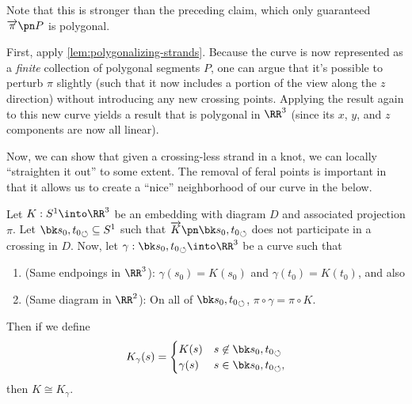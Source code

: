 Note that this is stronger than the preceding claim, which only
guaranteed $\fim{\pi}{P}$ is polygonal.
\begin{sproof}[Sketch]
  First, apply \cref{lem:polygonalizing-strands}. Because the curve is
  now represented as a \emph{finite} collection of polygonal segments
  $P$, one can argue that it's possible to perturb $\pi$ slightly
  (such that it now includes a portion of the view along the $z$
  direction) without introducing any new crossing points. Applying the
  result again to this new curve yields a result that is polygonal in
  $\RR^3$ (since its $x$, $y$, and $z$ components are now all linear).
\end{sproof}

Now, we can show that given a crossing-less strand in a knot, we can
locally ``straighten it out'' to some extent. The removal of feral
points is important in that it allows us to create a ``nice''
neighborhood of our curve in the below.
\begin{proposition}\label{prop:replacing-by-same-endpoints}
  Let $K : S^1 \into \RR^3$ be an embedding with diagram $D$ and
  associated projection $\pi$. Let $\sbk{s_0, t_0} \subseteq S^1$ such
  that $\fim{K}{\sbk{s_0, t_0}}$ does not participate in a crossing in
  $D$. Now, let $\gamma : \sbk{s_0, t_0} \into \RR^3$ be a curve such
  that
  \begin{enumerate}
    \item (Same endpoings in $\RR^3$): $\gamma(s_0) = K(s_0)$ and
      $\gamma(t_0) = K(t_0)$, and also
    \item (Same diagram in $\RR^2$): On all of $\sbk{s_0, t_0}$, $\pi
      \circ \gamma = \pi \circ K$.
  \end{enumerate}
  Then if we define
  \[
    K_\gamma(s) =
    \begin{cases}
      K(s) & s \not \in \sbk{s_0, t_0}\\
      \gamma(s) & s \in \sbk{s_0, t_0},
    \end{cases}
  \]
  then $K \cong K_\gamma$.
\end{proposition}
